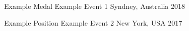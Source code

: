 
\begin{cvhonors}

  \cvhonor
    {Example Medal} %
    {Example Event 1} %
    {Syndney, Australia} %
    {2018} %

  \cvhonor
    {Example Position} %
    {Example Event 2} %
    {New York, USA} %
    {2017} %
    
   

\end{cvhonors}
